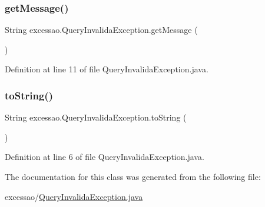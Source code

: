 \subsubsection{\texorpdfstring{get\+Message()}{getMessage()}}
{\footnotesize\ttfamily String excessao.\+Query\+Invalida\+Exception.\+get\+Message (\begin{DoxyParamCaption}{ }\end{DoxyParamCaption})}



Definition at line 11 of file Query\+Invalida\+Exception.\+java.

\hypertarget{classexcessao_1_1QueryInvalidaException_ac49499062d57f2eeefc351a1d14e5ce8}{}\label{classexcessao_1_1QueryInvalidaException_ac49499062d57f2eeefc351a1d14e5ce8} 
\subsubsection{\texorpdfstring{to\+String()}{toString()}}
{\footnotesize\ttfamily String excessao.\+Query\+Invalida\+Exception.\+to\+String (\begin{DoxyParamCaption}{ }\end{DoxyParamCaption})}



Definition at line 6 of file Query\+Invalida\+Exception.\+java.



The documentation for this class was generated from the following file\+:\begin{DoxyCompactItemize}
\item 
excessao/\hyperlink{QueryInvalidaException_8java}{Query\+Invalida\+Exception.\+java}\end{DoxyCompactItemize}
